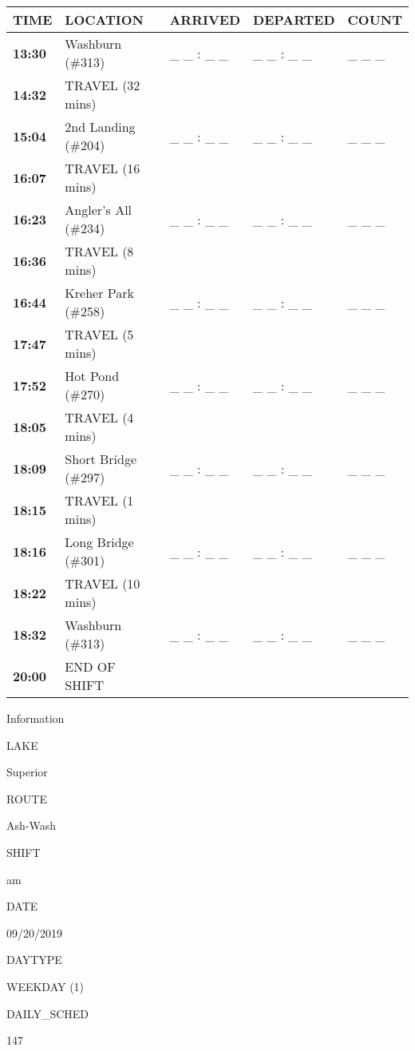 \documentclass[]{article}
\begin{document}
\begin{tabular}{>{\bfseries}lllll}
\toprule
\textbf{TIME} & \textbf{LOCATION} & \textbf{ARRIVED} & \textbf{DEPARTED} & \textbf{COUNT}\\
\midrule
13:30 & Washburn (\#313) & \_ \_ : \_ \_ & \_ \_ : \_ \_ & \_ \_ \_\\
14:32 & TRAVEL (32 mins) &  &  & \\
15:04 & 2nd Landing (\#204) & \_ \_ : \_ \_ & \_ \_ : \_ \_ & \_ \_ \_\\
16:07 & TRAVEL (16 mins) &  &  & \\
16:23 & Angler's All (\#234) & \_ \_ : \_ \_ & \_ \_ : \_ \_ & \_ \_ \_\\
16:36 & TRAVEL (8 mins) &  &  & \\
16:44 & Kreher Park (\#258) & \_ \_ : \_ \_ & \_ \_ : \_ \_ & \_ \_ \_\\
17:47 & TRAVEL (5 mins) &  &  & \\
17:52 & Hot Pond (\#270) & \_ \_ : \_ \_ & \_ \_ : \_ \_ & \_ \_ \_\\
18:05 & TRAVEL (4 mins) &  &  & \\
18:09 & Short Bridge (\#297) & \_ \_ : \_ \_ & \_ \_ : \_ \_ & \_ \_ \_\\
18:15 & TRAVEL (1 mins) &  &  & \\
18:16 & Long Bridge (\#301) & \_ \_ : \_ \_ & \_ \_ : \_ \_ & \_ \_ \_\\
18:22 & TRAVEL (10 mins) &  &  & \\
18:32 & Washburn (\#313) & \_ \_ : \_ \_ & \_ \_ : \_ \_ & \_ \_ \_\\
20:00 & END OF SHIFT &  &  & \\
\bottomrule
\end{tabular}\newpage

Information

LAKE

Superior

ROUTE

Ash-Wash

SHIFT

am

DATE

09/20/2019

DAYTYPE

WEEKDAY (1)

DAILY\_SCHED

147

\vspace{24pt}
\end{document}
